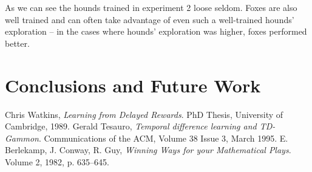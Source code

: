 \documentclass[a4paper]{article}
\begin{document}








As we can see the hounds trained in experiment 2 loose seldom. Foxes are also
well trained and can often take advantage of even such a well-trained hounds'
exploration -- in the cases where hounds' exploration was higher, foxes
performed better.

\section{Conclusions and Future Work}

\begin{thebibliography}{9}
    Chris Watkins,
    {\em Learning from Delayed Rewards}.
    PhD Thesis, University of Cambridge, 1989.
    Gerald Tesauro,
    {\em Temporal difference learning and TD-Gammon}.
    Communications of the ACM,
    Volume 38 Issue 3, March 1995.
    E. Berlekamp, J. Conway, R. Guy,
    {\em Winning Ways for your Mathematical Plays}.
    Volume 2, 1982, p. 635--645.
\end{thebibliography}
\end{document}
